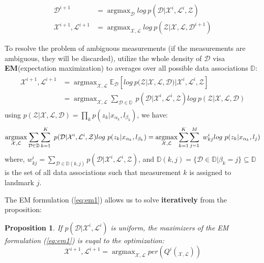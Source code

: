 \documentclass[12pt]{article}
\DeclareMathOperator*{\argmax}{argmax} %
\numberwithin{equation}{section}
\newtheorem{Proposition}{Proposition}
\begin{document}
\begin{subequations}
\begin{align}
	\mathcal{D}^{i+1} &= \argmax_{\mathcal{D}} log\ p(\mathcal{D}|\mathcal{X}^i,\mathcal{L}^i,\mathcal{Z}) \\
	\mathcal{X}^{i+1}, \mathcal{L}^{i+1} &= \argmax_{\mathcal{X},\mathcal{L}} log\ p(\mathcal{Z}|\mathcal{X},\mathcal{L},\mathcal{D}^{i+1})
\end{align}
\end{subequations} \par
To resolve the problem of ambiguous measurements (if the measurements are ambiguous, they will be discarded), utilize the whole density of $\mathcal{D}$ visa \textbf{EM}(expectation maximization) to averages over all possible data associations $\mathbb{D}$:
\begin{align}\begin{split}\label{eq:em1}
	\mathcal{X}^{i+1}, \mathcal{L}^{i+1} &= 
	\argmax_{\mathcal{X},\mathcal{L}} \mathbb{E}_{\mathcal{D}} [log\ p(\mathcal{Z}|\mathcal{X},\mathcal{L},\mathcal{D})|\mathcal{X}^i,\mathcal{L}^i,\mathcal{Z}] \\
	&= \argmax_{\mathcal{X},\mathcal{L}} \sum_{\mathcal{D} \in \mathbb{D}} \ p(\mathcal{D}|\mathcal{X}^i,\mathcal{L}^i,\mathcal{Z}) log\ p(\mathcal{Z}|\mathcal{X},\mathcal{L},\mathcal{D})
\end{split}\end{align}
using $p(\mathcal{Z}|\mathcal{X},\mathcal{L},\mathcal{D})=\prod_kp(z_k|x_{\alpha_k}, l_{\beta_k})$, we have:
\begin{equation}\label{eq:em2}
	\argmax_{\mathcal{X},\mathcal{L}} \sum_{\mathcal{D} \in \mathbb{D}} \sum_{k=1}^K \ p(\mathcal{D}|\mathcal{X}^i,\mathcal{L}^i,\mathcal{Z})log\ p(z_k|x_{\alpha_k}, l_{\beta_k})  \\
	= \argmax_{\mathcal{X},\mathcal{L}} \sum_{k=1}^K \sum_{j=1}^{M} \ w^i_{kj} log\ p(z_k|x_{\alpha_k}, l_j) 
\end{equation}
where, $w^i_{kj}=\sum_{\mathcal{D} \in \mathbb{D}(k,j)} p(\mathcal{D}|\mathcal{X}^i,\mathcal{L}^i,\mathcal{Z})$, and $\mathbb{D}(k,j)=\{\mathcal{D} \in \mathbb{D} | \beta_k = j\} \subseteq \mathbb{D}$ is the set of all data associations such that measurement $k$ is assigned to landmark $j$. \par
The EM formulation (\ref{eq:em1}) allows us to solve \textbf{iteratively} from the proposition:
\begin{Proposition}
	If $p(\mathcal{D}|\mathcal{X}^i,\mathcal{L}^i)$ is uniform, the maximizers of the EM formulation (\ref{eq:em1}) is euqal to the optimization:
	\begin{equation}
		\mathcal{X}^{i+1}, \mathcal{L}^{i+1} = \argmax_{\mathcal{X},\mathcal{L}} per(Q^i(_{\mathcal{X},\mathcal{L}}))
	\end{equation}
\end{Proposition} \par
\end{document}
